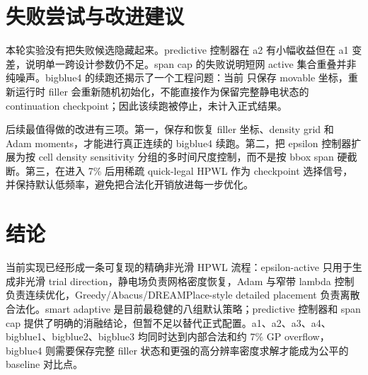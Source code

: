 \documentclass[11pt,a4paper]{ctexart}
\newcommand{\code}[1]{\texttt{\detokenize{#1}}}
\begin{document}
\section{失败尝试与改进建议}

本轮实验没有把失败候选隐藏起来。predictive 控制器在 a2 有小幅收益但在 a1 变差，说明单一跨设计参数仍不足。span cap 的失败说明短网 active 集合重叠并非纯噪声。bigblue4 的续跑还揭示了一个工程问题：当前 \code{global.pl} 只保存 movable 坐标，重新运行时 filler 会重新随机初始化，不能直接作为保留完整静电状态的 continuation checkpoint；因此该续跑被停止，未计入正式结果。

后续最值得做的改进有三项。第一，保存和恢复 filler 坐标、density grid 和 Adam moments，才能进行真正连续的 bigblue4 续跑。第二，把 epsilon 控制器扩展为按 cell density sensitivity 分组的多时间尺度控制，而不是按 bbox span 硬截断。第三，在进入 7\% 后用稀疏 quick-legal HPWL 作为 checkpoint 选择信号，并保持默认低频率，避免把合法化开销放进每一步优化。

\section{结论}

当前实现已经形成一条可复现的精确非光滑 HPWL 流程：epsilon-active 只用于生成非光滑 trial direction，静电场负责网格密度恢复，Adam 与窄带 lambda 控制负责连续优化，Greedy/Abacus/DREAMPlace-style detailed placement 负责离散合法化。smart adaptive 是目前最稳健的八组默认策略；predictive 控制器和 span cap 提供了明确的消融结论，但暂不足以替代正式配置。a1、a2、a3、a4、bigblue1、bigblue2、bigblue3 均同时达到内部合法和约 7\% GP overflow，bigblue4 则需要保存完整 filler 状态和更强的高分辨率密度求解才能成为公平的 baseline 对比点。
\end{document}
